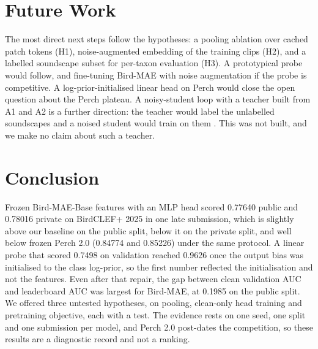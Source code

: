 \documentclass[letterpaper]{article} %
\begin{document}
\section{Future Work}
The most direct next steps follow the hypotheses: a pooling ablation over cached patch tokens (H1), noise-augmented embedding of the training clips (H2), and a labelled soundscape subset for per-taxon evaluation (H3). A prototypical probe would follow, and fine-tuning Bird-MAE with noise augmentation if the probe is competitive. A log-prior-initialised linear head on Perch would close the open question about the Perch plateau. A noisy-student loop with a teacher built from A1 and A2 is a further direction: the teacher would label the unlabelled soundscapes and a noised student would train on them \citep{xie2020selftraining,hinton2015distilling}. This was not built, and we make no claim about such a teacher.

\section{Conclusion}
Frozen Bird-MAE-Base features with an MLP head scored 0.77640 public and 0.78016 private on BirdCLEF+ 2025 in one late submission, which is slightly above our baseline on the public split, below it on the private split, and well below frozen Perch 2.0 (0.84774 and 0.85226) under the same protocol. A linear probe that scored 0.7498 on validation reached 0.9626 once the output bias was initialised to the class log-prior, so the first number reflected the initialisation and not the features. Even after that repair, the gap between clean validation AUC and leaderboard AUC was largest for Bird-MAE, at 0.1985 on the public split. We offered three untested hypotheses, on pooling, clean-only head training and pretraining objective, each with a test. The evidence rests on one seed, one split and one submission per model, and Perch 2.0 post-dates the competition, so these results are a diagnostic record and not a ranking.


\end{document}
